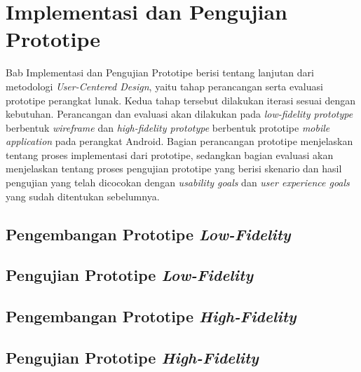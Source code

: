 \chapter{Implementasi dan Pengujian Prototipe}

Bab Implementasi dan Pengujian Prototipe berisi tentang lanjutan dari metodologi \textit{User-Centered Design}, yaitu tahap perancangan serta evaluasi prototipe perangkat lunak. Kedua tahap tersebut dilakukan iterasi sesuai dengan kebutuhan. Perancangan dan evaluasi akan dilakukan pada \textit{low-fidelity prototype} berbentuk \textit{wireframe} dan \textit{high-fidelity prototype} berbentuk prototipe \textit{mobile application} pada perangkat Android. Bagian perancangan prototipe menjelaskan tentang proses implementasi dari prototipe, sedangkan bagian evaluasi akan menjelaskan tentang proses pengujian prototipe yang berisi skenario dan hasil pengujian yang telah dicocokan dengan \textit{usability goals} dan \textit{user experience goals} yang sudah ditentukan sebelumnya. 

\section{Pengembangan Prototipe \textit{Low-Fidelity}}
\blindtext

\section{Pengujian Prototipe \textit{Low-Fidelity}}
\blindtext

\section{Pengembangan Prototipe \textit{High-Fidelity}}
\blindtext

\section{Pengujian Prototipe \textit{High-Fidelity}}
\blindtext